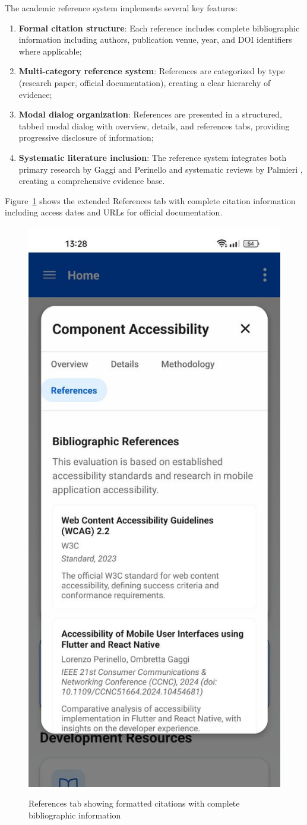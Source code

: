 \pagebreak

The academic reference system implements several key features:

\begin{enumerate}
    \item \textbf{Formal citation structure}: Each reference includes complete bibliographic information including authors, publication venue, year, and DOI identifiers where applicable;
    
    \item \textbf{Multi-category reference system}: References are categorized by type (research paper, official documentation), creating a clear hierarchy of evidence;
    
    \item \textbf{Modal dialog organization}: References are presented in a structured, tabbed modal dialog with overview, details, and references tabs, providing progressive disclosure of information;
    
    \item \textbf{Systematic literature inclusion}: The reference system integrates both primary research by Gaggi and Perinello \cite{perinello2024accessibility} and systematic reviews by Palmieri \cite{palmieri2022accessibility}, creating a comprehensive evidence base.
\end{enumerate}

Figure~\ref{fig:academic_references_detail} shows the extended References tab with complete citation information including access dates and URLs for official documentation.

\begin{figure}[ht]
    \centering
    \includegraphics[width=0.4\linewidth, alt={Reference tab showing detailed citation information}]{img/references.jpg}
    \caption{References tab showing formatted citations with complete bibliographic information}
    \label{fig:academic_references_detail}
\end{figure}


